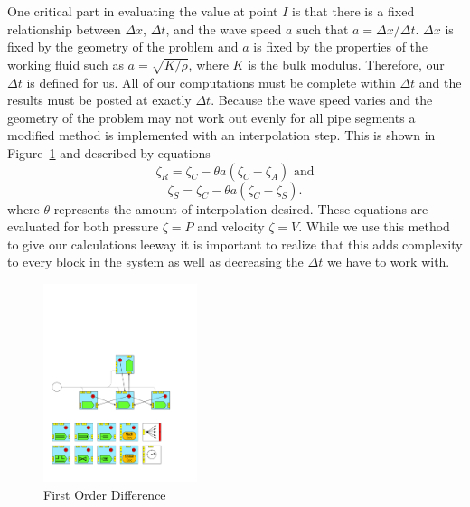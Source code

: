One critical part in evaluating the value at point \(I\) is that there is a fixed relationship between \(\Delta x\), \(\Delta t\), and the wave speed \(a\) such that \(a=\Delta x/\Delta t\).  \(\Delta x\) is fixed by the geometry of the problem and \(a\) is fixed by the properties of the working fluid such as \(a=\sqrt{K/\rho}\), where \(K\) is the bulk modulus. 
Therefore, our \(\Delta t\) is defined for us.  
All of our computations must be complete within \(\Delta t\) and the results must be posted at exactly \(\Delta t\).  Because the wave speed varies and the geometry of the problem may not work out evenly for all pipe segments a modified method is implemented with an interpolation step.  This is shown in Figure~\ref{Interp} and described by equations
%
\begin{equation}
\zeta_R=\zeta_C-\theta a(\zeta_C-\zeta_A) \text{ and}
\end{equation}
%
\begin{equation}
\zeta_S=\zeta_C-\theta a(\zeta_C-\zeta_S).
\end{equation}
%
where \(\theta\) represents the amount of interpolation desired.
These equations are evaluated for both pressure \(\zeta = P\) and velocity \(\zeta = V\).
While we use this method to give our calculations leeway it is important to realize that this adds complexity to every block in the system as well as decreasing the \(\Delta t\) we have to work with.  
%
\begin{figure}  
\centering 
\includegraphics[width=0.4\textwidth,page=10]{./figs/1dcfd/ElementalProcessors.pdf}
\caption{First Order Difference} 
\label{Interp}
\end{figure}


